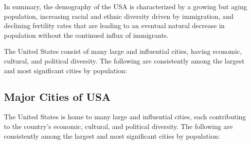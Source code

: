 


In summary, the demography of the USA is characterized by a growing but aging population, increasing racial and ethnic diversity driven by immigration, and declining fertility rates that are leading to an eventual natural decrease in population without the continued influx of immigrants.

The United States consist of many large and influential cities, having economic, cultural, and political diversity. The following are consistently among the largest and most significant cities by population:

\subsection{Major Cities of USA}
The United States is home to many large and influential cities, each contributing to the country's economic, cultural, and political diversity. The following are consistently among the largest and most significant cities by population:

